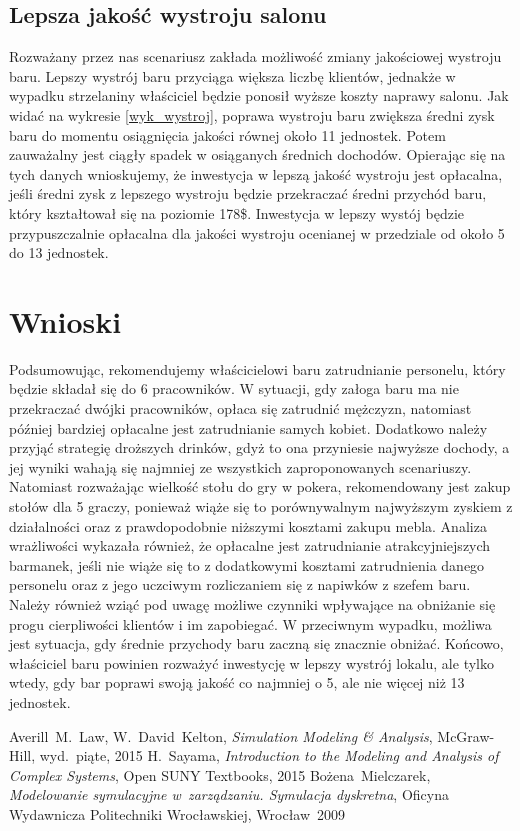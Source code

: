\documentclass[12pt, a4paper, oneside]{mwart} %
\begin{document}
\subsection{Lepsza jakość wystroju salonu}
Rozważany przez nas scenariusz zakłada możliwość zmiany jakościowej wystroju baru. Lepszy wystrój baru przyciąga większa liczbę klientów, jednakże w wypadku strzelaniny właściciel będzie ponosił wyższe koszty naprawy salonu. Jak widać na wykresie \ref{wyk_wystroj}, poprawa wystroju baru zwiększa średni zysk baru do momentu osiągnięcia jakości równej około 11 jednostek. Potem zauważalny jest ciągły spadek w osiąganych średnich dochodów. Opierając się na tych danych wnioskujemy, że inwestycja w lepszą jakość wystroju jest opłacalna, jeśli średni zysk z lepszego wystroju będzie przekraczać średni przychód baru, który kształtował się na poziomie 178\$. Inwestycja w lepszy wystój będzie przypuszczalnie opłacalna dla jakości wystroju ocenianej w przedziale od około 5 do 13 jednostek.

\section{Wnioski}
Podsumowując, rekomendujemy właścicielowi baru zatrudnianie personelu, który będzie składał się do 6 pracowników. W sytuacji, gdy załoga baru ma nie przekraczać dwójki pracowników, opłaca się zatrudnić mężczyzn, natomiast później bardziej opłacalne jest zatrudnianie samych kobiet. Dodatkowo należy przyjąć strategię droższych drinków, gdyż to ona przyniesie najwyższe dochody, a jej wyniki wahają się najmniej ze wszystkich zaproponowanych scenariuszy. Natomiast rozważając wielkość stołu do gry w pokera, rekomendowany jest zakup stołów dla 5 graczy, ponieważ wiąże się  to porównywalnym najwyższym zyskiem z działalności oraz  z prawdopodobnie niższymi kosztami zakupu mebla. Analiza wrażliwości wykazała również, że opłacalne jest zatrudnianie atrakcyjniejszych barmanek, jeśli nie wiąże się to z dodatkowymi kosztami zatrudnienia danego personelu oraz z jego uczciwym rozliczaniem się z napiwków z szefem baru. Należy również wziąć pod uwagę możliwe czynniki wpływające na obniżanie się progu cierpliwości klientów i im zapobiegać. W przeciwnym wypadku, możliwa jest sytuacja, gdy średnie przychody baru zaczną się znacznie obniżać. Końcowo, właściciel baru powinien rozważyć inwestycję w lepszy wystrój lokalu, ale tylko wtedy, gdy bar poprawi swoją jakość co najmniej o 5, ale nie więcej niż 13 jednostek.

\begin{thebibliography}{9}
Averill~M.~Law, W.~David~Kelton,
\emph{Simulation Modeling \& Analysis},
McGraw-Hill, wyd.~piąte, 2015
H.~Sayama, \emph{Introduction to the Modeling and Analysis of Complex Systems},
Open SUNY Textbooks, 2015
Bożena~Mielczarek, \emph{Modelowanie symulacyjne w~zarządzaniu. Symulacja dyskretna},
Oficyna Wydawnicza Politechniki Wrocławskiej, Wrocław~2009
\end{thebibliography}
\end{document}
